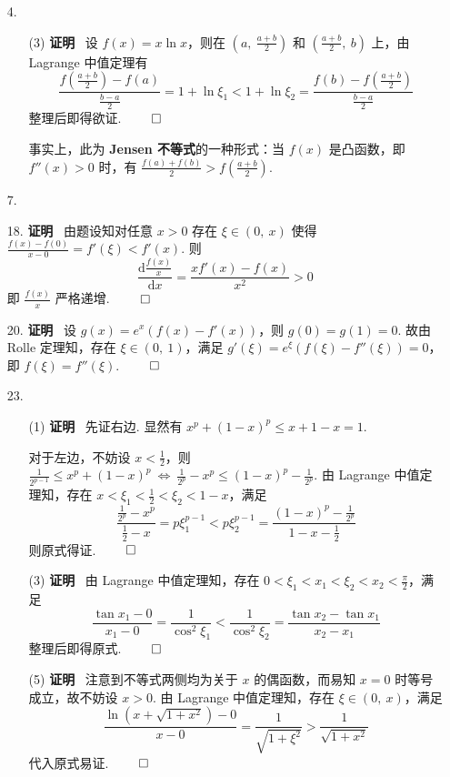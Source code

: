 \documentclass[11pt,oneside,fontset=fandol]{ctexbook} %
\begin{document}
\begin{enumerate}
    \item[4.]
    \begin{enumerate}
        \item[(3)]
        \textbf{证明} \ 设 $f(x) = x \ln x$，则在 $\left( a,\ \frac {a+b} 2 \right)$ 和 $\left( \frac {a+b} 2,\ b \right)$ 上，由 Lagrange 中值定理有
        \[
            \frac{f\left( \frac {a+b} 2 \right) - f(a)}{\frac {b-a} 2} = 1 + \ln \xi_1 < 1 + \ln \xi_2 = \frac{f(b) - f\left( \frac {a+b} 2 \right)}{\frac {b-a} 2}
        \]
        整理后即得欲证.
        $\hfill\qed$

        事实上，此为 \textbf{Jensen 不等式}的一种形式：当 $f(x)$ 是凸函数，即 $f''(x) > 0$ 时，有 $\frac {f(a) + f(b)} 2 > f(\frac {a+b} 2)$.
    \end{enumerate}
    \item[7.]
    \item[18.]
    \textbf{证明} \ 由题设知对任意 $x>0$ 存在 $\xi \in (0,\ x)$ 使得 $\frac{f(x)-f(0)}{x-0} = f'(\xi) < f'(x)$. 则
    \[
        \frac{\mathrm d \frac{f(x)}{x}}{\mathrm dx} = \frac{xf'(x)-f(x)}{x^2} > 0
    \]
    即 $\frac{f(x)}{x}$ 严格递增.
    $\hfill\qed$
    \item[20.]
    \textbf{证明} \ 设 $g(x)=e^x\left( f(x)-f'(x) \right)$，则 $g(0) = g(1) = 0$. 故由 Rolle 定理知，存在 $\xi \in (0,\ 1)$，满足 $g'(\xi) = e^{\xi}\left( f(\xi) - f''(\xi) \right) = 0$，即 $f(\xi) = f''(\xi)$.
    $\hfill\qed$
    \item[23.]
    \begin{enumerate}
        \item[(1)]
        \textbf{证明} \ 先证右边. 显然有 $x^p + (1-x)^p \leqslant x + 1-x = 1$.
        
        对于左边，不妨设 $x < \frac 1 2$，则 $\frac 1 {2^{p-1}} \leqslant x^p + (1-x)^p \ \Leftrightarrow \ \frac 1 {2^p} - x^p \leqslant (1-x)^p - \frac 1 {2^p}$. 由 Lagrange 中值定理知，存在 $x < \xi_1 < \frac 1 2 < \xi_2 < 1-x$，满足
        \[
            \frac{\frac 1 {2^p} - x^p}{\frac 1 2 - x} = p\xi_1^{p-1} < p\xi_2^{p-1} = \frac{(1-x)^p - \frac 1 {2^p}}{1-x-\frac 1 2}
        \]
        则原式得证.
        $\hfill\qed$
        \item[(3)]
        \textbf{证明} \ 由 Lagrange 中值定理知，存在 $0 < \xi_1 < x_1 < \xi_2 < x_2 < \frac \pi 2$，满足
        \[
            \frac{\tan x_1-0}{x_1-0} = \frac 1 {\cos^2 \xi_1} < \frac 1 {\cos^2 \xi_2} = \frac{\tan x_2 - \tan x_1}{x_2 - x_1}
        \]
        整理后即得原式.
        $\hfill\qed$
        \item[(5)]
        \textbf{证明} \ 注意到不等式两侧均为关于 $x$ 的偶函数，而易知 $x = 0$ 时等号成立，故不妨设 $x > 0$. 由 Lagrange 中值定理知，存在 $\xi \in (0,\ x)$，满足
        \[
            \frac{\ln\left( x+\sqrt{1+x^2} \right)-0}{x-0} = \frac 1 {\sqrt{1+\xi^2}} > \frac 1 {\sqrt{1+x^2}}
        \]
        代入原式易证.
        $\hfill\qed$
    \end{enumerate}
\end{enumerate}
\end{document}
